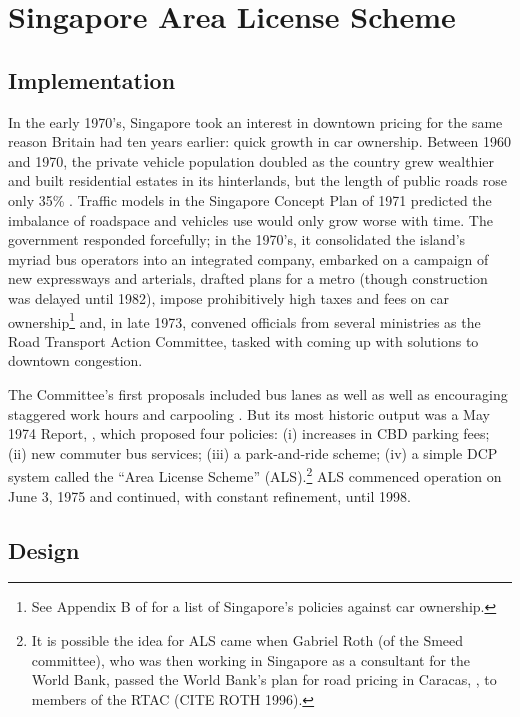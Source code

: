 \section{Singapore Area License Scheme}\label{sec:als}

\subsection{Implementation}

In the early 1970's, Singapore took an interest in downtown pricing for the same reason Britain had ten years earlier: quick growth in car ownership. Between 1960 and 1970, the private vehicle population doubled as the country grew wealthier and built residential estates in its hinterlands, but the length of public roads rose only 35\% \citep{Santos2004}. Traffic models in the Singapore Concept Plan of 1971 predicted the imbalance of roadspace and vehicles use would only grow worse with time. The government responded forcefully; in the 1970's, it consolidated the island's myriad bus operators into an integrated company, embarked on a campaign of new expressways and arterials, drafted plans for a metro (though construction was delayed until 1982), impose prohibitively high taxes and fees on car ownership\footnote{See Appendix B of \citet{Gomez-Ibanez1994} for a list of Singapore's policies against car ownership.} and, in late 1973, convened officials from several ministries as the Road Transport Action Committee, tasked with coming up with solutions to downtown congestion. 

The Committee's first proposals included bus lanes as well as well as encouraging staggered work hours and carpooling \citep{Chin1998}. But its most historic output was a May 1974 Report, \citet{SRTAC1974}, which proposed four policies: (i) increases in CBD parking fees; (ii) new commuter bus services; (iii) a park-and-ride scheme; (iv) a simple DCP system called the ``Area License Scheme'' (ALS).\footnote{It is possible the idea for ALS came when Gabriel Roth (of the Smeed committee), who was then working in Singapore as a consultant for the World Bank, passed the World Bank's plan for road pricing in Caracas, \citet{Vorhees1973}, to members of the RTAC (CITE ROTH 1996).} ALS commenced operation on June 3, 1975 and continued, with constant refinement, until 1998.

\subsection{Design}

